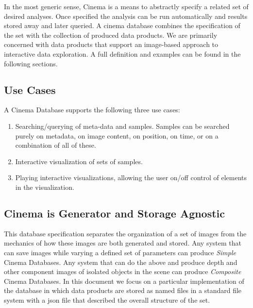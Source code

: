 \documentclass{article}
\newcommand{\Composite} {\textit{Composite}\xspace}
\begin{document}
In the most generic sense, Cinema is a means to abstractly specify a related set of desired analyses. Once specified the analysis can be run automatically and results stored away and later queried. A cinema database combines the specification of the set with the collection of produced data products. We are primarily concerned with data products that support an image-based approach to interactive data exploration. A full definition and examples can be found in the following sections.

\subsection{Use Cases}
A Cinema Database supports the following three use cases:
\begin{enumerate}
\item Searching/querying of meta-data and samples. Samples can be searched purely on metadata, on image content, on position, on time, or on a combination of all of these.
\item Interactive visualization of sets of samples.
\item Playing interactive visualizations, allowing the user on/off control of elements in the visualization.
\end{enumerate}

\subsection{Cinema is Generator and Storage Agnostic}
This database specification separates the organization of a set of images from the mechanics of how these images are both generated and stored. Any system that can save images while varying a defined set of parameters can produce \textit{Simple} Cinema Databases. Any system that can do the above and produce depth and other component images of isolated objects in the scene can produce \Composite Cinema Databases. In this document we focus on a particular implementation of the database in which data products are stored as named files in a standard file system with a json file that described the overall structure of the set.
\end{document}
